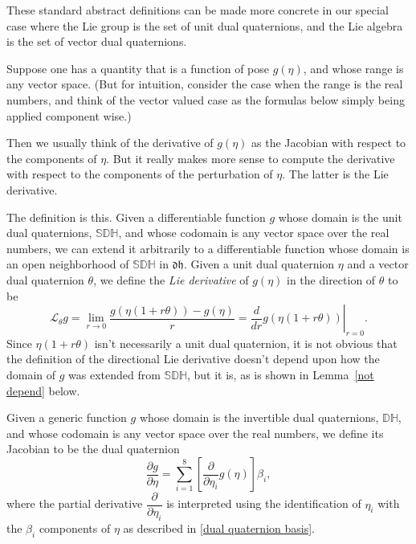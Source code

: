 \documentclass[reqno,12pt]{amsart}
\newcommand\setinvertibledualquat{\mathbb D\mathbb H}
\newcommand\setdualquat{\mathfrak d \mathfrak h}
\newcommand\setunitdualquat{\mathbb S\mathbb D\mathbb H}
\newcommand{\liederiv}{\mathcal L}
\begin{document}
These standard abstract definitions can be made more concrete in our special case where the Lie group is the set of unit dual quaternions, and the Lie algebra is the set of vector dual quaternions.

Suppose one has a quantity that is a function of pose $g(\eta)$, and whose range is any vector space.  (But for intuition, consider the case when the range is the real numbers, and think of the vector valued case as the formulas below simply being applied component wise.)

Then we usually think of the derivative of $g(\eta)$ as the Jacobian with respect to the components of $\eta$.  But it really makes more sense to compute the derivative with respect to the components of the perturbation of $\eta$.  The latter is the Lie derivative.

The definition is this.  Given a differentiable function $g$ whose domain is the unit dual quaternions, $\setunitdualquat$, and whose codomain is any vector space over the real numbers, we can extend it arbitrarily to a differentiable function whose domain is an open neighborhood of $\setunitdualquat$ in $\setdualquat$.  Given a unit dual quaternion $\eta$ and a vector dual quaternion $\theta$, we define the \emph{Lie derivative} of $g(\eta)$ in the direction of $\theta$ to be
\begin{equation}
\label{lie diff defn}
\liederiv_\theta g = 
\lim_{r\to 0} \frac{g(\eta(1+r \theta)) - g(\eta)} r = 
\left. \frac{d}{d r} g(\eta(1+r\theta)) \right |_{r = 0}.
\end{equation}
Since $\eta(1+r\theta)$ isn't necessarily a unit dual quaternion, it is not obvious that the definition of the directional Lie derivative doesn't depend upon how the domain of $g$ was extended from $\setunitdualquat$, but it is, as is shown in Lemma~\ref{not depend} below.

Given a generic function $g$ whose domain is the invertible dual quaternions, $\setinvertibledualquat$, and whose codomain is any vector space over the real numbers, we define its Jacobian to be the dual quaternion
\begin{equation}
\label{jacobian defn}
\frac{\partial g}{\partial \eta} = \sum_{i=1}^8 \left[\frac{\partial}{\partial \eta_i} g(\eta) \right] \beta_i,
\end{equation}
where the partial derivative $\dfrac{\partial}{\partial \eta_i}$ is interpreted using the identification of $\eta_i$ with the $\beta_i$ components of $\eta$ as described in \eqref{dual quaternion basis}.
\end{document}
